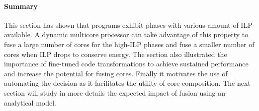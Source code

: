 \paragraph{Summary}
This section has shown that programs exhibit phases with various amount of ILP available.
A dynamic multicore processor can take advantage of this property to fuse a large number of cores for the high-ILP phases and fuse a smaller number of cores when ILP drops to conserve energy.
The section also illustrated the importance of fine-tuned code transformations to achieve sustained performance and increase the potential for fusing cores.
Finally it motivates the use of automating the decision as it facilitates the utility of core composition.
The next section will study in more details the expected impact of fusion using an analytical model.

